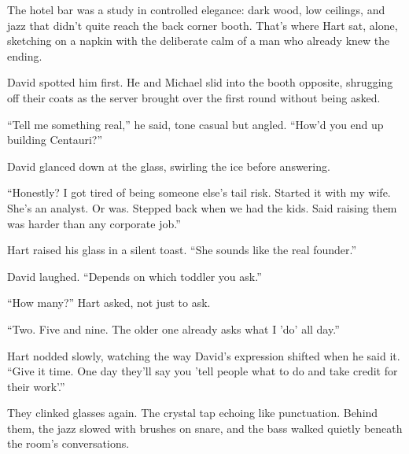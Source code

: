 The hotel bar was a study in controlled elegance: dark wood, low ceilings, and jazz that didn’t 
quite reach the back corner booth.
That’s where Hart sat, alone, sketching on a napkin with the deliberate calm of a man who already knew 
the ending.

David spotted him first.
He and Michael slid into the booth opposite, shrugging off their coats as the server brought over the 
first round without being asked.

``Tell me something real,'' he said, tone casual but angled. ``How’d you end up building Centauri?''

David glanced down at the glass, swirling the ice before answering.

``Honestly? I got tired of being someone else’s tail risk. Started it with my wife. She’s an analyst. 
Or was. Stepped back when we had the kids. Said raising them was harder than any corporate job.''

Hart raised his glass in a silent toast. ``She sounds like the real founder.''

David laughed. ``Depends on which toddler you ask.''

``How many?'' Hart asked, not just to ask.

``Two. Five and nine. The older one already asks what I 'do' all day.''

Hart nodded slowly, watching the way David’s expression shifted when he said it.
``Give it time. One day they’ll say you 'tell people what to do and take credit for their work'.''

They clinked glasses again. The crystal tap echoing like punctuation. Behind them, the jazz slowed with 
brushes on snare, and the bass walked quietly beneath the room’s conversations.

\medskip

